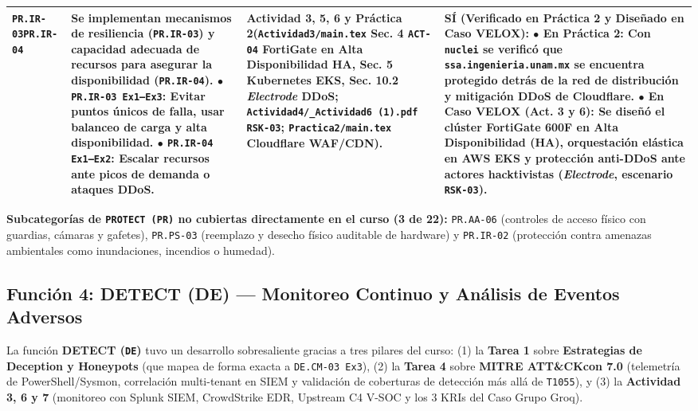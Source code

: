 \documentclass[letterpaper,11pt]{article}
\begin{document}
\begin{longtable}{|C{1.5cm}|L{5.3cm}|L{4.3cm}|L{5.8cm}|}
\texttt{PR.IR-03}\newline \texttt{PR.IR-04} &
\textbf{Se implementan mecanismos de resiliencia (\texttt{PR.IR-03}) y capacidad adecuada de recursos para asegurar la disponibilidad (\texttt{PR.IR-04}).}\newline
$\bullet$ \texttt{PR.IR-03 Ex1--Ex3}: Evitar puntos únicos de falla, usar balanceo de carga y alta disponibilidad.\newline
$\bullet$ \texttt{PR.IR-04 Ex1--Ex2}: Escalar recursos ante picos de demanda o ataques DDoS. &
\textbf{Actividad 3, 5, 6 y Práctica 2}\newline (\texttt{Actividad3/main.tex} Sec. 4 \texttt{ACT-04} FortiGate en Alta Disponibilidad HA, Sec. 5 Kubernetes EKS, Sec. 10.2 \textit{Electrode} DDoS; \texttt{Actividad4/\_Actividad6 (1).pdf} \texttt{RSK-03}; \texttt{Practica2/main.tex} Cloudflare WAF/CDN). &
\textbf{SÍ (Verificado en Práctica 2 y Diseñado en Caso VELOX):}\newline
$\bullet$ \textbf{En Práctica 2:} Con \texttt{nuclei} se verificó que \texttt{ssa.ingenieria.unam.mx} se encuentra protegido detrás de la red de distribución y mitigación DDoS de \textbf{Cloudflare}.\newline
$\bullet$ \textbf{En Caso VELOX (Act. 3 y 6):} Se diseñó el clúster \textbf{FortiGate 600F en Alta Disponibilidad (HA)}, orquestación elástica en \textbf{AWS EKS} y protección anti-DDoS ante actores hacktivistas (\textit{Electrode}, escenario \texttt{RSK-03}). \\
\hline
\end{longtable}
\endgroup

\noindent\textbf{Subcategorías de \texttt{PROTECT (PR)} no cubiertas directamente en el curso (3 de 22):} \texttt{PR.AA-06} (controles de acceso físico con guardias, cámaras y gafetes), \texttt{PR.PS-03} (reemplazo y desecho físico auditable de hardware) y \texttt{PR.IR-02} (protección contra amenazas ambientales como inundaciones, incendios o humedad).

\subsection{Función 4: DETECT (DE) --- Monitoreo Continuo y Análisis de Eventos Adversos}

La función \textbf{DETECT (\texttt{DE})} tuvo un desarrollo sobresaliente gracias a tres pilares del curso: (1) la \textbf{Tarea 1} sobre \textbf{Estrategias de Deception y Honeypots} (que mapea de forma exacta a \texttt{DE.CM-03 Ex3}), (2) la \textbf{Tarea 4} sobre \textbf{MITRE ATT\&CKcon 7.0} (telemetría de PowerShell/Sysmon, correlación multi-tenant en SIEM y validación de coberturas de detección más allá de \texttt{T1055}), y (3) la \textbf{Actividad 3, 6 y 7} (monitoreo con Splunk SIEM, CrowdStrike EDR, Upstream C4 V-SOC y los 3 KRIs del Caso Grupo Groq).
\end{document}
